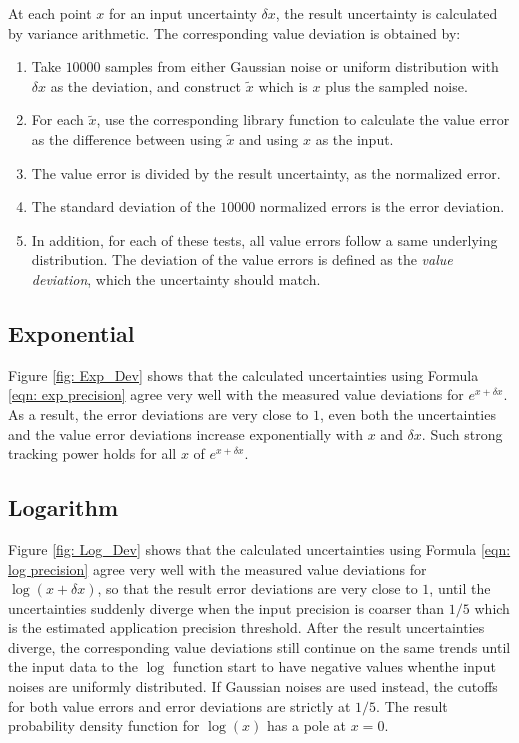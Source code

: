 \documentclass[twoside]{article}
\numberwithin{equation}{section}
\begin{document}
At each point $x$ for an input uncertainty $\delta x$, the result uncertainty is calculated by variance arithmetic.
The corresponding value deviation is obtained by:
\begin{enumerate}

\item Take $10000$ samples from either Gaussian noise or uniform distribution with $\delta x$ as the deviation, and construct $\tilde{x}$ which is $x$ plus the sampled noise.  

\item For each $\tilde{x}$, use the corresponding library function to calculate the value error as the difference between using $\tilde{x}$ and using $x$ as the input.

\item The value error is divided by the result uncertainty, as the normalized error.

\item The standard deviation of the $10000$ normalized errors is the error deviation.

\item In addition, for each of these tests, all value errors follow a same underlying distribution.
The deviation of the value errors is defined as the \emph{value deviation}, which the uncertainty should match.

\end{enumerate}

\subsection{Exponential}

Figure \ref{fig: Exp_Dev} shows that the calculated uncertainties using Formula \eqref{eqn: exp precision} agree very well with the measured value deviations for $e^{x + \delta x}$.
As a result, the error deviations are very close to $1$, even both the uncertainties and the value error deviations increase exponentially with $x$ and $\delta x$.
Such strong tracking power holds for all $x$ of $e^{x + \delta x}$. 

\subsection{Logarithm}

Figure \ref{fig: Log_Dev} shows that the calculated uncertainties using Formula \eqref{eqn: log precision} agree very well with the measured value deviations for $\log(x + \delta x)$, so that the result error deviations are very close to $1$, until the uncertainties suddenly diverge when the input precision is coarser than $1/5$ which is the estimated application precision threshold.
After the result uncertainties diverge, the corresponding value deviations still continue on the same trends until the input data to the $\log$ function start to have negative values whenthe input noises are uniformly distributed.
If Gaussian noises are used instead, the cutoffs for both value errors and error deviations are strictly at $1/5$.
The result probability density function for $\log(x)$ has a pole at $x=0$.
\end{document}
